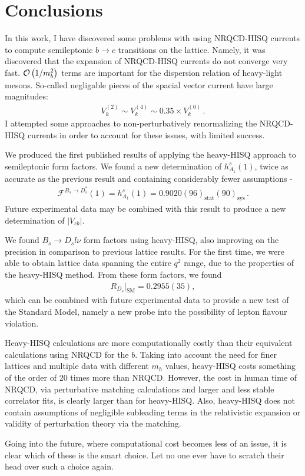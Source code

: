 ﻿\chapter{Conclusions}

In this work, I have discovered some problems with using NRQCD-HISQ currents to compute semileptonic $b\to c$ transitions on the lattice. Namely, it was discovered that the expansion of NRQCD-HISQ currents do not converge very fast. $\mathcal{O}\left( 1/m_b^2 \right)$ terms are important for the dispersion relation of heavy-light mesons. So-called negligable pieces of the spacial vector current have large magnitudes:
\begin{align}
  V_k^{(2)}\sim V_k^{(4)} \sim 0.35\times V_k^{(0)}\,.
\end{align}
I attempted some approaches to non-perturbatively renormalizing the NRQCD-HISQ currents in order to account for these issues, with limited success. 

We
produced the first published results of applying the heavy-HISQ approach to semileptonic form factors. We found a new determination of $h_{A_1}^s(1)$, twice as accurate as the previous result and containing considerably fewer assumptions -
\begin{align}
  \mathcal{F}^{B_s\to D_s^*}(1) = h^s_{A_1}(1) = 0.9020(96)_{\text{stat}}(90)_{\text{sys}}\,.
\end{align}
Future experimental data may be combined with this result to produce a new determination of $|V_{cb}|$.

We found $B_s\to D_sl\nu$ form factors using heavy-HISQ, also improving on the precision in comparison to previous lattice results. For the first time, we were able to obtain lattice data spanning the entire $q^2$ range, due to the properties of the heavy-HISQ method. From these form factors, we found
\begin{align}
  R_{D_s}|_{\text{SM}} = 0.2955(35),
\end{align}
which can be combined with future experimental data to provide a new test of the Standard Model, namely a new probe into the possibility of lepton flavour violation.

Heavy-HISQ calculations are more computationally costly than their equivalent calculations using NRQCD for the $b$. Taking into account the need for finer lattices and multiple data with different $m_h$ values, heavy-HISQ costs something of the order of 20 times more than NRQCD. However, the cost in human time of NRQCD, via perturbative matching calculations and larger and less stable correlator fits, is clearly larger than for heavy-HISQ. Also, heavy-HISQ does not contain assumptions of negligible subleading terms in the relativistic expansion or validity of perturbation theory via the matching.

Going into the future, where computational cost becomes less of an issue, it is clear which of these is the smart choice. Let no one ever have to scratch their head over such a choice again.

